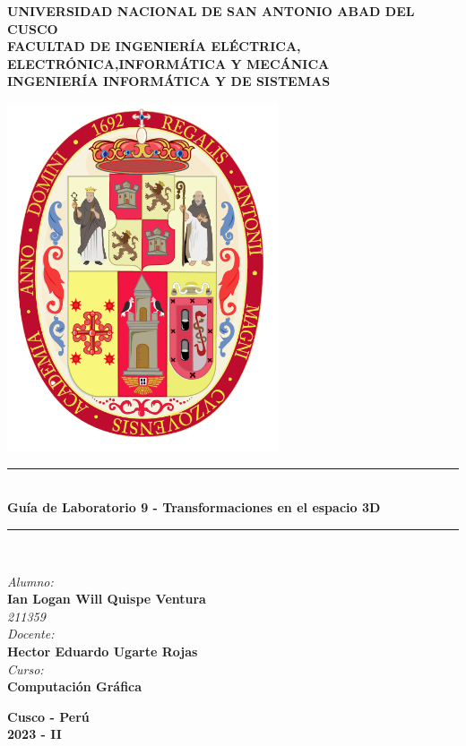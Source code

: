 \documentclass[a4paper]{article}
\begin{document}
\begin{titlepage}

\newcommand{\linea}{\rule{\linewidth}{0.7mm}} 
\center
\textbf{\Large UNIVERSIDAD NACIONAL DE SAN ANTONIO ABAD DEL CUSCO}\\[0.2cm]
\textbf{\Large FACULTAD DE INGENIERÍA ELÉCTRICA, ELECTRÓNICA,INFORMÁTICA Y MECÁNICA}\\[0.2cm]
\textbf{\Large INGENIERÍA INFORMÁTICA Y DE SISTEMAS\\[0.6cm]}

\includegraphics[width=8cm]{src/escudo-unsaac.png}
\vfill

\linea
\\[0.3cm]
\textbf{\LARGE Guía de Laboratorio 9 - Transformaciones en el espacio 3D}\\[0.2cm]
\linea \\
\vfill

\textit{\Large Alumno:}\\
    \textbf{\large Ian Logan Will Quispe Ventura}\\
    \textit{211359}\\

\vspace{0.3cm}
    \textit{\Large Docente:}\\
    \textbf{\large Hector Eduardo Ugarte Rojas}\\
\vspace{0.5cm}
    \textit{\Large Curso:}\\
    \textbf{\large Computación Gráfica}\\
    \vfill

\vspace{0.4cm}
    \textbf{\Large Cusco - Perú }\\
    \textbf{\large 2023 - II }\\
    \newpage
    \end{titlepage}
\end{document}
